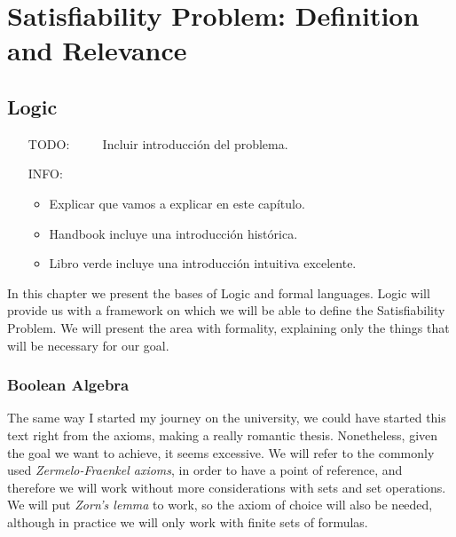 
\part{Satisfiability Problem: Definition and Relevance} %

\label{Chapter1} %


\newcommand{\keyword}[1]{\textbf{#1}}
\newcommand{\tabhead}[1]{\textbf{#1}}
\newcommand{\code}[1]{\texttt{#1}}
\newcommand{\file}[1]{\texttt{\bfseries#1}}
\newcommand{\option}[1]{\texttt{\itshape#1}}


\chapter{Logic}
\begin{itemize}
\item[TODO:]$\qquad$ Incluir introducción del problema.

\item[INFO:]
  \begin{itemize}
  \item Explicar que vamos a explicar en este capítulo.
  \item Handbook incluye una introducción histórica.
  \item Libro verde incluye una introducción intuitiva excelente.
\end{itemize}
\end{itemize}


In this chapter we present the bases of Logic and formal languages. Logic will provide us with a framework on which we will be able to define the Satisfiability Problem. We will present the area with formality, explaining only the things that will be necessary for our goal.


\section{Boolean Algebra}

The same way I started my journey on the university, we could have started this text right from the axioms, making a really romantic thesis. Nonetheless, given the goal we want to achieve, it seems excessive. We will refer to the commonly used \emph{Zermelo-Fraenkel axioms}, in order to have a point of reference, and therefore we will work without more considerations with sets and set operations. We will put \emph{Zorn's lemma} to work, so the axiom of choice will also be needed, although in practice we will only work with finite sets of formulas.\\

